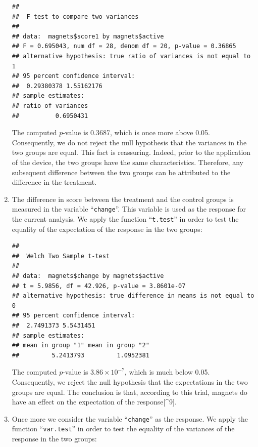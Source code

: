 \documentclass[]{krantz}
\makeatletter
\newenvironment{Shaded}{\begin{snugshade}}{\end{snugshade}}
\newcommand{\KeywordTok}[1]{\textcolor[rgb]{0.13,0.29,0.53}{\textbf{#1}}}
\newcommand{\NormalTok}[1]{#1}
\newcommand{\OperatorTok}[1]{\textcolor[rgb]{0.81,0.36,0.00}{\textbf{#1}}}
\newcommand{\StringTok}[1]{\textcolor[rgb]{0.31,0.60,0.02}{#1}}
\newenvironment{kframe}{%
\medskip{}
\setlength{\fboxsep}{.8em}
 \def\at@end@of@kframe{}%
 \ifinner\ifhmode%
  \def\at@end@of@kframe{\end{minipage}}%
  \begin{minipage}{\columnwidth}%
 \fi\fi%
 \def\FrameCommand##1{\hskip\@totalleftmargin \hskip-\fboxsep
 \colorbox{shadecolor}{##1}\hskip-\fboxsep
     \hskip-\linewidth \hskip-\@totalleftmargin \hskip\columnwidth}%
 \MakeFramed {\advance\hsize-\width
   \@totalleftmargin\z@ \linewidth\hsize
   \@setminipage}}%
 {\par\unskip\endMakeFramed%
 \at@end@of@kframe}
\renewenvironment{Shaded}{\begin{kframe}}{\end{kframe}}
\theoremstyle{definition}
\theoremstyle{definition}
\theoremstyle{definition}
\theoremstyle{remark}
\makeatother
\begin{document}
\begin{enumerate}
\begin{verbatim}
## 
##  F test to compare two variances
## 
## data:  magnets$score1 by magnets$active
## F = 0.695043, num df = 28, denom df = 20, p-value = 0.36865
## alternative hypothesis: true ratio of variances is not equal to 1
## 95 percent confidence interval:
##  0.29380378 1.55162176
## sample estimates:
## ratio of variances 
##          0.6950431
\end{verbatim}

  The computed \(p\)-value is 0.3687, which is once more above 0.05.
  Consequently, we do not reject the null hypothesis that the variances in
  the two groups are equal. This fact is reassuring. Indeed, prior to the
  application of the device, the two groups have the same characteristics.
  Therefore, any subsequent difference between the two groups can be
  attributed to the difference in the treatment.
\item
  The difference in score between the
  treatment and the control groups is measured in the variable ``\texttt{change}''.
  This variable is used as the response for the current analysis. We apply
  the function ``\texttt{t.test}'' in order to test the equality of the expectation
  of the response in the two groups:

\begin{Shaded}
\end{Shaded}

\begin{verbatim}
## 
##  Welch Two Sample t-test
## 
## data:  magnets$change by magnets$active
## t = 5.9856, df = 42.926, p-value = 3.8601e-07
## alternative hypothesis: true difference in means is not equal to 0
## 95 percent confidence interval:
##  2.7491373 5.5431451
## sample estimates:
## mean in group "1" mean in group "2" 
##         5.2413793         1.0952381
\end{verbatim}

  The computed \(p\)-value is \(3.86\times 10^{-7}\), which is much below
  0.05. Consequently, we reject the null hypothesis that the expectations
  in the two groups are equal. The conclusion is that, according to this
  trial, magnets do have an effect on the expectation of the response{[}\^{}9{]}.
\item
  Once more we consider the variable
  ``\texttt{change}'' as the response. We apply the function ``\texttt{var.test}'' in order
  to test the equality of the variances of the response in the two groups:


\end{enumerate}
\end{document}
